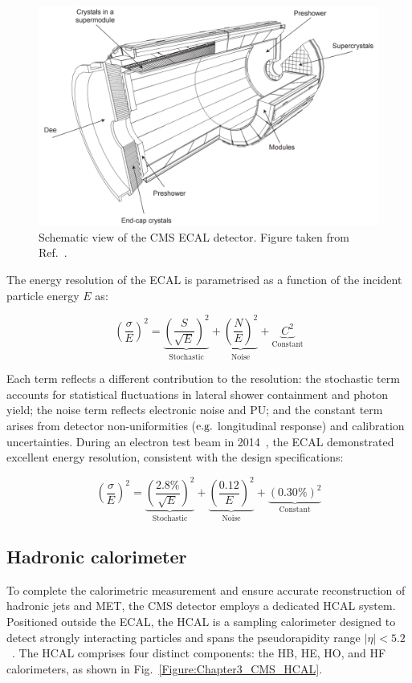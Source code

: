 \begin{figure}[h]
\centering
\includegraphics[width= 1.0\textwidth]{Figures/Chapter3/CMS_ECAL.pdf}
\caption{Schematic view of the CMS ECAL detector. Figure taken from Ref.~\cite{LHC_CMS}.}
\label{Figure:Chapter3_CMS_ECAL}
\end{figure}

The energy resolution of the ECAL is parametrised as a function of the incident particle energy $E$ as:

\begin{equation}
    \left(\frac{\sigma}{E}\right)^2 =  \underbrace{\left(\frac{S}{\sqrt{E}}\right)^2}_{\text{Stochastic}} +  \underbrace{\left(\frac{N}{E}\right)^2}_{\text{Noise}} +  \underbrace{C^2}_{\text{Constant}}
\end{equation}

Each term reflects a different contribution to the resolution: the stochastic term accounts for statistical fluctuations in lateral shower containment and photon yield; the noise term reflects electronic noise and PU; and the constant term arises from detector non-uniformities ($\mbox{e.g.}$ longitudinal response) and calibration uncertainties. During an electron test beam in 2014~\cite{ECAL_TestBeam}, the ECAL demonstrated excellent energy resolution, consistent with the design specifications:

\begin{equation}
    \left(\frac{\sigma}{E}\right)^2 =  \underbrace{\left(\frac{2.8\%}{\sqrt{E}}\right)^2}_{\text{Stochastic}} +  \underbrace{\left(\frac{0.12}{E}\right)^2}_{\text{Noise}} +  \underbrace{(0.30\%)^2}_{\text{Constant}}
\end{equation}

\subsection{Hadronic calorimeter}
To complete the calorimetric measurement and ensure accurate reconstruction of hadronic jets and \ac{MET}, the CMS detector employs a dedicated HCAL system. Positioned outside the ECAL, the HCAL is a sampling calorimeter designed to detect strongly interacting particles and spans the pseudorapidity range $|\eta| < 5.2$~\cite{LHC_CMS,CMS_Detector_Run3}. The HCAL comprises four distinct components: the \ac{HB}, \ac{HE}, \ac{HO}, and \ac{HF} calorimeters, as shown in Fig.~\ref{Figure:Chapter3_CMS_HCAL}.

